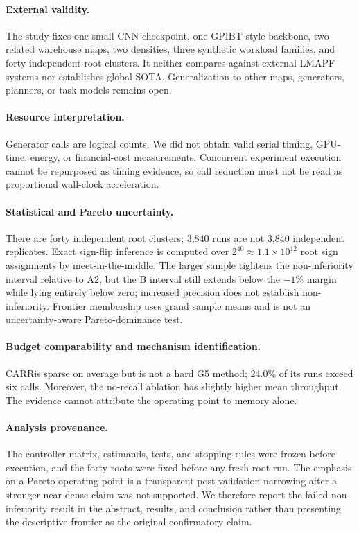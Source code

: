 \documentclass[sigconf,anonymous,review]{acmart}
\newcommand{\carr}{\textsc{CARR}}
\begin{document}
\paragraph{External validity.}
The study fixes one small CNN checkpoint, one GPIBT-style backbone, two related
warehouse maps, two densities, three synthetic workload families, and forty
independent root clusters. It neither compares against external LMAPF systems
nor establishes global SOTA. Generalization to other maps, generators,
planners, or task models remains open.

\paragraph{Resource interpretation.}
Generator calls are logical counts. We did not obtain valid serial timing,
GPU-time, energy, or financial-cost measurements. Concurrent experiment
execution cannot be repurposed as timing evidence, so call reduction must not
be read as proportional wall-clock acceleration.

\paragraph{Statistical and Pareto uncertainty.}
There are forty independent root clusters; 3{,}840 runs are not 3{,}840
independent replicates. Exact sign-flip inference is computed over
$2^{40}\approx1.1\times10^{12}$ root sign assignments by meet-in-the-middle.
The larger sample tightens the non-inferiority interval relative to A2, but the
B interval still extends below the $-1\%$ margin while lying entirely below
zero; increased precision does not establish non-inferiority. Frontier
membership uses grand sample means and is not an uncertainty-aware
Pareto-dominance test.

\paragraph{Budget comparability and mechanism identification.}
\carr is sparse on average but is not a hard G5 method; 24.0\% of its runs
exceed six calls. Moreover, the no-recall ablation has slightly higher mean
throughput. The evidence cannot attribute the operating point to memory alone.

\paragraph{Analysis provenance.}
The controller matrix, estimands, tests, and stopping rules were frozen
before execution, and the forty roots were fixed before any fresh-root run. The
emphasis on a Pareto operating point is a transparent post-validation narrowing
after a stronger near-dense claim was not supported. We therefore report the
failed non-inferiority result in the abstract, results, and conclusion rather
than presenting the descriptive frontier as the original confirmatory claim.
\end{document}
